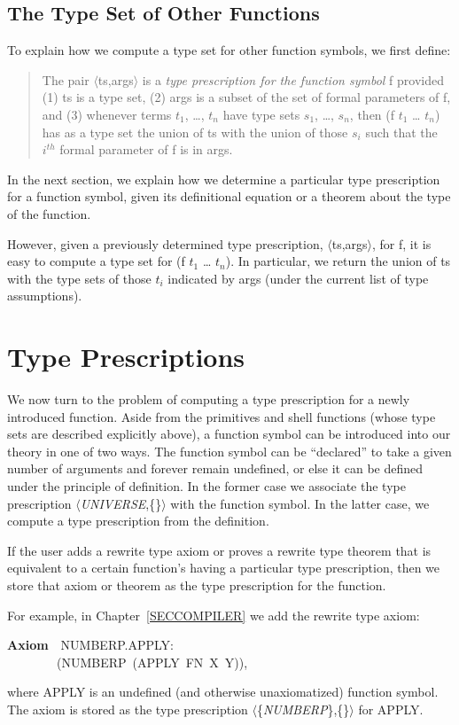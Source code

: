 \documentclass[10pt]{book}
\newenvironment{pubasis}{\begin{flushleft}}{\end{flushleft}}
\newenvironment{pubcrown}{\begin{quote}}{\end{quote}}
\newcommand{\axiomordefinition}[1]{\vspace{6pt}\Large\textsf{\textbf{#1}}\normalsize}
\begin{document}
\subsection{The Type Set of Other Functions}
To explain how we compute a type set for other function symbols,
we first define:
\begin{pubcrown}
The pair $\langle$ts,args$\rangle$ is a \emph{type prescription for the function symbol} f
provided (1) ts is a type set, (2) args is a subset of the set of formal
parameters of f, and (3) whenever terms $t_{1}$, \ldots{}, $t_{n}$ have type sets
$s_{1}$, \ldots{}, $s_{n}$, then (f $t_{1}$ \ldots{} $t_{n}$) has as a type set the union of ts
with the union of those $s_{i}$ such that the $i^{th}$ formal parameter of f is in args.
\end{pubcrown}

In the next section, we explain how we determine a particular
type prescription for a function symbol, given its definitional equation
or a theorem about the type of the function.

However, given a previously determined type prescription, $\langle$ts,args$\rangle$, for f,
it is easy to compute a type set for (f $t_{1}$ \ldots{} $t_{n}$).  In particular,
we return the union of ts with the type sets of those $t_{i}$ indicated by args
(under the current list of type assumptions).

\section{Type Prescriptions}
We now turn to the problem of computing a type prescription for a newly introduced
function.  Aside from the primitives and shell functions (whose type sets
are described explicitly above), a function symbol can be introduced into our theory
in one of two ways.  The function symbol can be ``declared'' to take a given number of arguments
and forever remain undefined, or else it can be defined under
the principle of definition.  In the former case we associate the type prescription
$\langle$\emph{UNIVERSE},\{\}$\rangle$ with the function symbol.  In the latter case,
we compute a type prescription from the definition.

If the user adds a rewrite type axiom or proves a rewrite type theorem
that is equivalent to a certain function's having a particular type
prescription, then we store that axiom or theorem as the type prescription
for the function.

For example, in Chapter~\ref{SECCOMPILER} we add the rewrite type axiom:
\begin{pubasis}
\axiomordefinition{Axiom}~~NUMBERP.APPLY:\\
~~~~~~~~(NUMBERP~(APPLY~FN~X~Y)),\\
\end{pubasis}
where APPLY is an undefined (and otherwise unaxiomatized) function
symbol.  The axiom is stored as the type prescription $\langle$\{\emph{NUMBERP}\},\{\}$\rangle$
for APPLY.
\end{document}
